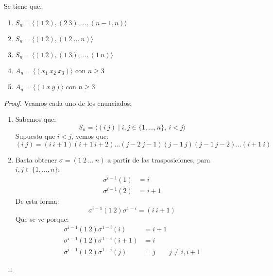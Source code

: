 \begin{prop}
    Se tiene que:
    \begin{enumerate}[label=(\alph*)]
        \item $S_n = \langle (1\ 2),(2\ 3),\ldots,(n-1, n) \rangle $
        \item $S_n = \langle (1\ 2), (1\ 2\ \ldots\ n) \rangle $
        \item $S_n = \langle (1\ 2),(1\ 3), \ldots, (1\ n)\rangle $
        \item $A_n = \langle (x_1\ x_2\ x_3) \rangle $ con $n\geq 3$
        \item $A_n = \langle (1\ x\ y) \rangle $ con $n\geq 3$
    \end{enumerate}
    \begin{proof}
        Veamos cada uno de los enunciados:
        \begin{enumerate}[label=(\alph*)]
            \item Sabemos que:
                \begin{equation*}
                    S_n = \langle (i\ j) \mid i,j \in \{1,\ldots,n\},\ i<j \rangle 
                \end{equation*}
                Supuesto que $i<j$, vemos que:
                \begin{equation*}
                    (i\ j) = (i\ i+1)(i+1\ i+2) \ldots (j-2\ j-1)(j-1\ j)(j-1\ j-2) \ldots (i+1\ i)
                \end{equation*}
            \item Basta obtener $\sigma=(1\ 2\ \ldots\ n)$ a partir de las trasposiciones, para $i,j\in \{1,\ldots,n\}$:
                \begin{align*}
                    \sigma^{i-1}(1) &= i \\
                    \sigma^{i-1}(2) &= i+1 
                \end{align*}
                De esta forma:
                \begin{equation*}
                    \sigma^{i-1}(1\ 2)\sigma^{1-i} = (i\ i+1)
                \end{equation*}
                Que se ve porque:
                \begin{align*}
                    \sigma^{i-1}(1\ 2)\sigma^{1-i}(i) &= i+1 \\
                    \sigma^{i-1}(1\ 2)\sigma^{1-i}(i+1) &= i \\
                    \sigma^{i-1}(1\ 2)\sigma^{1-i}(j) &= j \qquad j\neq i, i+1

\end{align*}
\end{enumerate}
\end{proof}
\end{prop}
